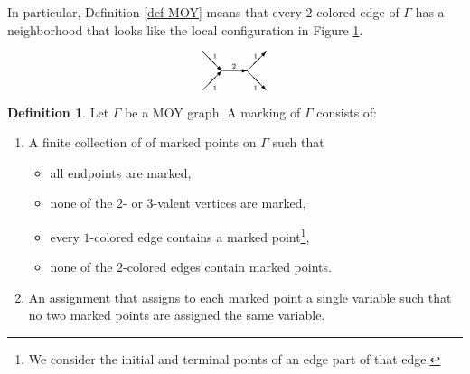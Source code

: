 \documentclass{amsart}
\theoremstyle{plain}
\theoremstyle{definition}
\newtheorem{definition}[theorem]{Definition}
\theoremstyle{remark}
\numberwithin{equation}{section}
\begin{document}
In particular, Definition \ref{def-MOY} means that every $2$-colored edge of $\Gamma$ has a neighborhood that looks like the local configuration in Figure \ref{fig-wide-edge}.

\begin{figure}[ht]

\[
\setlength{\unitlength}{1pt}
\begin{picture}(60,30)(-30,0)

\put(-10,15){\vector(1,0){20}}

\put(-25,0){\vector(1,1){15}}

\put(-25,30){\vector(1,-1){15}}

\put(10,15){\vector(1,-1){15}}

\put(10,15){\vector(1,1){15}}

\put(-2,17){\tiny{$2$}}

\put(-17,0){\tiny{$1$}}

\put(-17,25){\tiny{$1$}}

\put(15,0){\tiny{$1$}}

\put(15,25){\tiny{$1$}}

\end{picture}
\]

\caption{}\label{fig-wide-edge}

\end{figure}

\begin{definition}\label{def-MOY-marking}
Let $\Gamma$ be a MOY graph. A marking of $\Gamma$ consists of:
\begin{enumerate}
	\item A finite collection of of marked points on $\Gamma$ such that
  \begin{itemize}
		\item all endpoints are marked,
		\item none of the $2$- or $3$-valent vertices are marked,
		\item every $1$-colored edge contains a marked point\footnote{We consider the initial and terminal points of an edge part of that edge.},
		\item none of the $2$-colored edges contain marked points.
	\end{itemize}
	\item An assignment that assigns to each marked point a single variable such that no two marked points are assigned the same variable.
\end{enumerate}
\end{definition}
\end{document}
